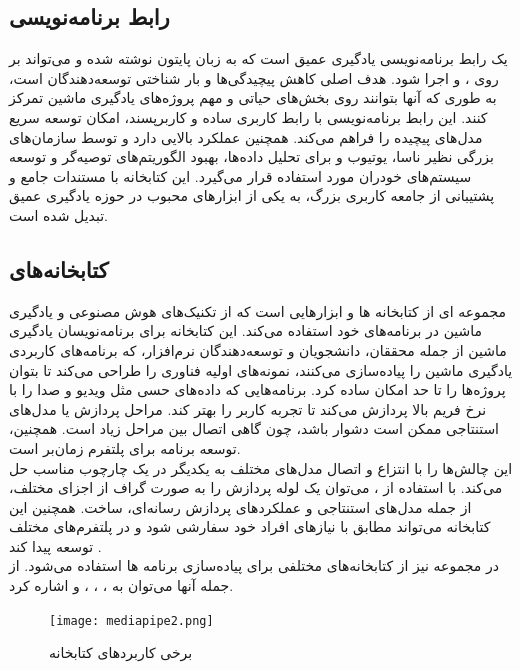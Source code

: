 \subsection{رابط برنامه‌نویسی }
 یک رابط برنامه‌نویسی یادگیری عمیق است که به زبان پایتون نوشته شده و می‌تواند بر روی ،  و  اجرا شود. هدف اصلی  کاهش پیچیدگی‌ها و بار شناختی توسعه‌دهندگان است، 
به طوری که آنها بتوانند روی بخش‌های حیاتی و مهم پروژه‌های یادگیری ماشین تمرکز کنند. این رابط برنامه‌نویسی با رابط کاربری ساده و کاربرپسند، امکان توسعه سریع مدل‌های پیچیده را فراهم
می‌کند.  همچنین عملکرد بالایی دارد و توسط سازمان‌های بزرگی نظیر ناسا، یوتیوب و  برای تحلیل داده‌ها، بهبود الگوریتم‌های توصیه‌گر و توسعه سیستم‌های خودران مورد استفاده قرار 
می‌گیرد. این کتابخانه با مستندات جامع و پشتیبانی از جامعه کاربری بزرگ، به یکی از ابزارهای محبوب در حوزه یادگیری عمیق تبدیل شده است.

\subsection{کتابخانه‌های}
 مجموعه ای از کتابخانه ها و ابزارهایی است که از تکنیک‌های هوش مصنوعی و یادگیری ماشین در برنامه‌های خود استفاده می‌کند.
این کتابخانه برای برنامه‌نویسان یادگیری ماشین از جمله محققان، دانشجویان و توسعه‌دهندگان نرم‌افزار، که برنامه‌های کاربردی یادگیری ماشین را پیاده‌سازی می‌کنند، نمونه‌های
اولیه فناوری را طراحی می‌کند تا بتوان پروژه‌ها را تا حد امکان ساده کرد.
برنامه‌هایی که داده‌های حسی مثل ویدیو و صدا را با نرخ فریم بالا پردازش می‌کند تا تجربه کاربر را بهتر کند. مراحل پردازش یا مدل‌های استنتاجی ممکن است دشوار باشد، چون 
گاهی اتصال بین مراحل زیاد است. همچنین، توسعه برنامه برای پلتفرم‌ زمان‌بر است. \cite{lugaresi2019mediapipe}
\\
 این چالش‌ها را با انتزاع و اتصال مدل‌های مختلف به یکدیگر در یک چارچوب مناسب حل می‌کند. با استفاده از ، می‌توان یک لوله پردازش را به صورت 
گراف از اجزای مختلف، از جمله مدل‌های استنتاجی و عملکردهای پردازش رسانه‌ای، ساخت.
همچنین این کتابخانه می‌تواند مطابق با نیازهای افراد خود سفارشی شود و در پلتفرم‌های مختلف توسعه پیدا کند \cite{harris2021applying}.
\\
در مجموعه  نیز از کتابخانه‌های مختلفی برای پیاده‌سازی برنامه ها استفاده می‌شود. از جمله آنها می‌توان به ، ، ،  و  اشاره کرد. \cite{harris2021applying}

\begin{figure}[h]
    \centering
    \texttt{[image: mediapipe2.png]}
    \caption{برخی کاربردهای کتابخانه }
\end{figure}

